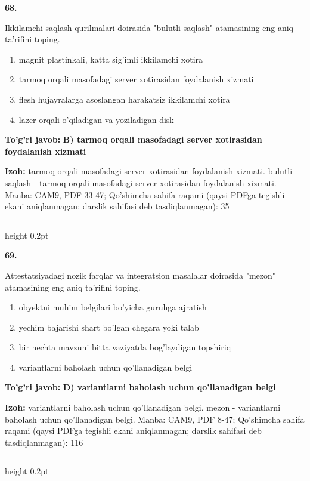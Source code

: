 \documentclass[10pt,a4paper]{article}
\begin{document}
{\bfseries\sffamily\color{ink} 68.}
\par
Ikkilamchi saqlash qurilmalari doirasida "bulutli saqlash" atamasining eng aniq ta'rifini toping.
\begin{enumerate}[label=\Alph*),leftmargin=9mm]
\item magnit plastinkali, katta sig'imli ikkilamchi xotira
\item tarmoq orqali masofadagi server xotirasidan foydalanish xizmati
\item flesh hujayralarga asoslangan harakatsiz ikkilamchi xotira
\item lazer orqali o'qiladigan va yoziladigan disk
\end{enumerate}
\begin{tcolorbox}[enhanced,breakable,colback=teal!4,colframe=teal!60!black,boxrule=0.45pt,arc=1.2mm,left=2.7mm,right=2.7mm,top=1.8mm,bottom=1.8mm,before skip=2mm,after skip=2mm]
{\bfseries\sffamily\color{teal}To'g'ri javob:} \textbf{B) tarmoq orqali masofadagi server xotirasidan foydalanish xizmati}
\par\smallskip
{\bfseries Izoh:} tarmoq orqali masofadagi server xotirasidan foydalanish xizmati. bulutli saqlash - tarmoq orqali masofadagi server xotirasidan foydalanish xizmati. Manba: CAM9, PDF 33-47; Qo'shimcha sahifa raqami (qaysi PDFga tegishli ekani aniqlanmagan; darslik sahifasi deb tasdiqlanmagan): 35
\end{tcolorbox}
\vspace{2mm}\hrule height 0.2pt\vspace{3mm}

{\bfseries\sffamily\color{ink} 69.}
\par
Attestatsiyadagi nozik farqlar va integratsion masalalar doirasida "mezon" atamasining eng aniq ta'rifini toping.
\begin{enumerate}[label=\Alph*),leftmargin=9mm]
\item obyektni muhim belgilari bo'yicha guruhga ajratish
\item yechim bajarishi shart bo'lgan chegara yoki talab
\item bir nechta mavzuni bitta vaziyatda bog'laydigan topshiriq
\item variantlarni baholash uchun qo'llanadigan belgi
\end{enumerate}
\begin{tcolorbox}[enhanced,breakable,colback=teal!4,colframe=teal!60!black,boxrule=0.45pt,arc=1.2mm,left=2.7mm,right=2.7mm,top=1.8mm,bottom=1.8mm,before skip=2mm,after skip=2mm]
{\bfseries\sffamily\color{teal}To'g'ri javob:} \textbf{D) variantlarni baholash uchun qo'llanadigan belgi}
\par\smallskip
{\bfseries Izoh:} variantlarni baholash uchun qo'llanadigan belgi. mezon - variantlarni baholash uchun qo'llanadigan belgi. Manba: CAM9, PDF 8-47; Qo'shimcha sahifa raqami (qaysi PDFga tegishli ekani aniqlanmagan; darslik sahifasi deb tasdiqlanmagan): 116
\end{tcolorbox}
\vspace{2mm}\hrule height 0.2pt\vspace{3mm}
\end{document}
